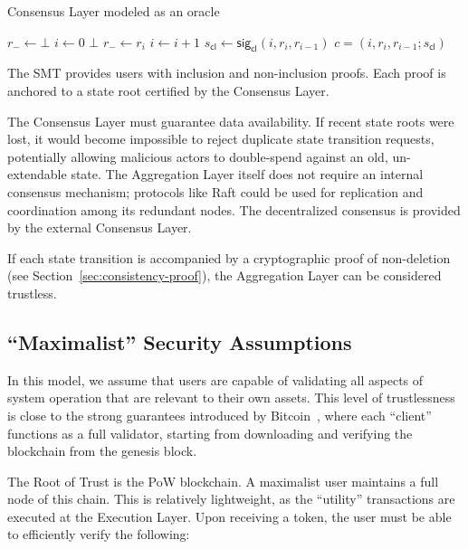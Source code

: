 \documentclass[twocolumn]{article}
\begin{document}
\begin{algorithm}[tbh]
  \caption{Consensus Layer modeled as an oracle}\label{alg:consensuslayer}
  \begin{algorithmic}[0]
        \State $r_- \gets \bot$
        \State $i \gets 0$
    \EndFunction
            \State \Return $\bot$
        \EndIf
        \State $r_- \gets r_i$
        \State $i \gets i+1$
        \State $s_{\textsf{cl}} \gets \textsf{sig}_\textsf{cl}(i, r_i, r_{i-1})$
        \State \Return $c = (i, r_i, r_{i-1}; s_{\textsf{cl}})$
    \EndFunction
  \end{algorithmic}
\end{algorithm}


The SMT provides users with inclusion and non-inclusion proofs. Each proof is anchored to a state root certified by the Consensus Layer.

The Consensus Layer must guarantee data availability. If recent state roots were lost, it would become impossible to reject duplicate state transition requests, potentially allowing malicious actors to double-spend against an old, un-extendable state. The Aggregation Layer itself does not require an internal consensus mechanism; protocols like Raft could be used for replication and coordination among its redundant nodes. The decentralized consensus is provided by the external Consensus Layer.

If each state transition is accompanied by a cryptographic proof of non-deletion (see Section~\ref{sec:consistency-proof}), the Aggregation Layer can be considered trustless.


\subsection{``Maximalist'' Security Assumptions}

In this model, we assume that users are capable of validating all aspects of system operation that are relevant to their own assets. This level of trustlessness is close to the strong guarantees introduced by Bitcoin~\cite{bitcoin}, where each ``client'' functions as a full validator, starting from downloading and verifying the blockchain from the genesis block.

The Root of Trust is the PoW blockchain. A maximalist user maintains a full node of this chain. This is relatively lightweight, as the ``utility'' transactions are executed at the Execution Layer. Upon receiving a token, the user must be able to efficiently verify the following:
\end{document}

